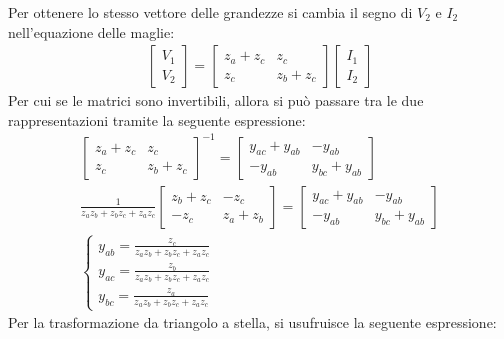 \documentclass{article}
\numberwithin{equation}{subsection}
\begin{document}
Per ottenere lo stesso vettore delle grandezze si cambia il segno di $V_2$ e $I_2$ nell'equazione delle maglie:
\begin{gather*}
    \begin{bmatrix}
        V_1\\V_2
    \end{bmatrix}=\begin{bmatrix}
        z_a+z_c&z_c\\z_c&z_b+z_c
    \end{bmatrix}\begin{bmatrix}
        I_1\\I_2
    \end{bmatrix}
\end{gather*}
Per cui se le matrici sono invertibili, allora si può passare tra le due rappresentazioni tramite la seguente espressione:
\begin{gather*}
    \begin{bmatrix}
        z_a+z_c&z_c\\z_c&z_b+z_c
    \end{bmatrix}^{-1}=\begin{bmatrix}
        y_{ac}+y_{ab}&-y_{ab}\\-y_{ab}&y_{bc}+y_{ab}
    \end{bmatrix}\\
    \displaystyle\frac{1}{z_az_b+z_bz_c+z_az_c}\begin{bmatrix}
        z_b+z_c&-z_c\\-z_c&z_a+z_b
    \end{bmatrix}=\begin{bmatrix}
        y_{ac}+y_{ab}&-y_{ab}\\-y_{ab}&y_{bc}+y_{ab}
    \end{bmatrix}\\
    \begin{cases}
        y_{ab}=\displaystyle\frac{z_c}{z_az_b+z_bz_c+z_az_c}\\
        y_{ac}=\displaystyle\frac{z_b}{z_az_b+z_bz_c+z_az_c}\\
        y_{bc}=\displaystyle\frac{z_a}{z_az_b+z_bz_c+z_az_c}
    \end{cases}
\end{gather*}
Per la trasformazione da triangolo a stella, si usufruisce la seguente espressione:
\end{document}
